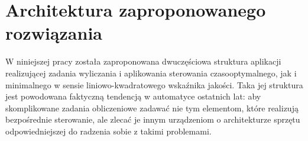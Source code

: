 \chapter{Architektura zaproponowanego rozwiązania}
\label{cha:arch}

W niniejszej pracy została zaproponowana dwuczęściowa struktura aplikacji realizującej zadania wyliczania i aplikowania sterowania czasooptymalnego, jak i minimalnego w sensie liniowo-kwadratowego wskaźnika jakości. Taka jej struktura jest powodowana faktyczną tendencją w automatyce ostatnich lat: aby skomplikowane zadania obliczeniowe zadawać nie tym elementom, które realizują bezpośrednie sterowanie, ale zlecać je innym urządzeniom o architekturze sprzętu odpowiedniejszej do radzenia sobie z takimi problemami.









